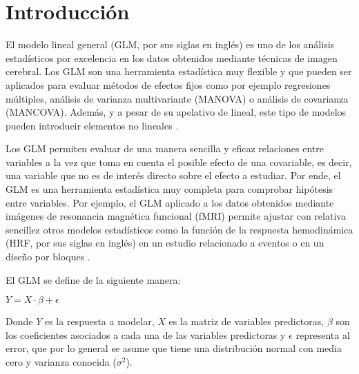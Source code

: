 % 
% 
% 

% 


\section{Introducción}

El modelo lineal general (GLM, por sus siglas en inglés) es uno de los análisis estadísticos por excelencia en los datos obtenidos mediante técnicas de imagen cerebral. Los GLM son una herramienta estadística muy flexible y que pueden ser aplicados para evaluar métodos de efectos fijos como por ejemplo regresiones múltiples, análisis de varianza multivariante (MANOVA) o análisis de covarianza (MANCOVA). Además, y a pesar de su apelativo de lineal, este tipo de modelos pueden introducir elementos no lineales \cite{chung2013statistical}.

Los GLM permiten evaluar de una manera sencilla y eficaz relaciones entre variables a la vez que toma en cuenta el posible efecto de una covariable, es decir, una variable que no es de interés directo sobre el efecto a estudiar. Por ende, el GLM es una herramienta estadística muy completa para comprobar hipótesis entre variables. Por ejemplo, el GLM aplicado a los datos obtenidos mediante imágenes de resonancia magnética funcional (fMRI) permite ajustar con relativa sencillez otros modelos estadísticos como la función de la respuesta hemodinámica (HRF, por sus siglas en inglés) en un estudio relacionado a eventos o en un diseño por bloques \cite{lazar2008statistical}.

El GLM se define de la siguiente manera:

\begin{center}
  $Y = X\cdot\beta + \epsilon$
\end{center}

Donde $Y$ es la respuesta a modelar, $X$ es la matriz de variables predictoras, $\beta$ son los coeficientes asociados a cada una de las variables predictoras y $\epsilon$ representa al error, que por lo general se asume que tiene una distribución normal con media cero y varianza conocida ($\sigma^2$).

